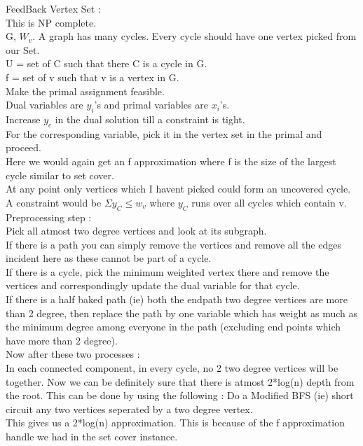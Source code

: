 \documentclass[solution,addpoints,12pt]{exam}
\begin{document}
FeedBack Vertex Set :\\
This is NP complete.\\
G, $W_v$. A graph has many cycles. Every cycle should have one vertex picked
from our Set.\\
U = set of C such that there C is a cycle in G.\\
f = set of v such that v is a vertex in G.\\
Make the primal assignment feasible.\\
Dual variables are $y_i$'s and primal variables are $x_i$'s.\\
Increase $y_c$ in the dual solution till a constraint is tight.\\
For the corresponding variable, pick it in the vertex set in the primal
and proceed.\\
Here we would again get an f approximation where f is
the size of the largest cycle similar to set cover.\\
At any point only vertices which I havent picked could form
an uncovered cycle.\\
A constraint would be $\Sigma y_C \le w_v$ where $y_C$ runs
over all cycles which contain v.\\
Preprocessing step :\\
Pick all atmost two degree vertices and look at its subgraph.\\
If there is a path you can simply remove the vertices and remove
all the edges incident here as these cannot be part of a cycle.\\
If there is a cycle, pick the minimum weighted vertex there and remove
the vertices and correspondingly update the dual variable for that cycle.\\
If there is a half baked path (ie) both the endpath two degree vertices
are more than 2 degree, then replace the path by one variable which
has weight as much as the minimum degree among everyone in the path
(excluding end points which have more than 2 degree).\\
Now after these two processes :\\
In each connected component, in every cycle, no 2 two degree vertices
will be together. Now we can be definitely sure that there is atmost
2*log(n) depth from the root. This can be done by using the following :
Do a Modified BFS (ie) short circuit any two vertices seperated by a
two degree vertex.\\
This gives us a 2*log(n) approximation. This is because of
the f approximation handle we had in the set cover instance.\\
\end{document}
